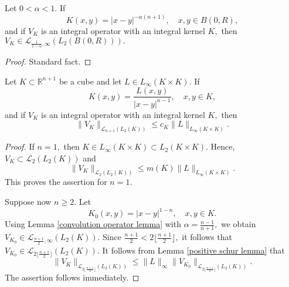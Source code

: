 \documentclass[12pt]{amsart}
\begin{document}
\begin{lemma}\label{convolution operator lemma} Let $0<\alpha<1.$ If
$$K(x,y)=|x-y|^{-\alpha(n+1)},\quad x,y\in B(0,R),$$
and if $V_K$ is an integral operator with an integral kernel $K,$ then $V_K\in\mathcal{L}_{\frac{1}{1-\alpha},\infty}(L_2(B(0,R))).$
\end{lemma}
\begin{proof} Standard fact.
\end{proof}

\begin{lemma}\label{rough estimate} Let $K\subset\mathbb{R}^{n+1}$ be a cube and let $L\in L_{\infty}(K\times K).$ If
$$K(x,y)=\frac{L(x,y)}{|x-y|^{n-1}},\quad x,y\in K,$$
and if $V_K$ is an integral operator with an integral kernel $K,$ then
$$\|V_K\|_{\mathcal{L}_{n+1}(L_2(K))}\leq c_K\|L\|_{L_{\infty}(K\times K)}.$$
\end{lemma}
\begin{proof} If $n=1,$ then $K\in L_{\infty}(K\times K)\subset L_2(K\times K).$ Hence, $V_K\subset \mathcal{L}_2(L_2(K))$ and
$$\|V_K\|_{\mathcal{L}_2(L_2(K))}\leq m(K)\|L\|_{L_{\infty}(K\times K)}.$$
This proves the assertion for $n=1.$
	
Suppose now $n\geq 2.$ Let
$$K_0(x,y)=|x-y|^{1-n},\quad x,y\in K.$$
Using Lemma \ref{convolution operator lemma} with $\alpha=\frac{n-1}{n+1},$ we obtain $V_{K_0}\in\mathcal{L}_{\frac{n+1}{2},\infty}(L_2(K)).$ Since $\frac{n+1}{2}< 2\lfloor\frac{n+1}{2}\rfloor,$ it follows that $V_{K_0}\in\mathcal{L}_{2\lfloor\frac{n+1}{2}\rfloor}(L_2(K)).$ It follows from Lemma \ref{positive schur lemma} that
$$\|V_K\|_{\mathcal{L}_{2\lfloor\frac{n+1}{2}\rfloor}(L_2(K))}\leq\|L\|_{\infty}\|V_{K_0}\|_{\mathcal{L}_{2\lfloor\frac{n+1}{2}\rfloor}(L_2(K))}.$$
The assertion follows immediately.
\end{proof}
\end{document}
